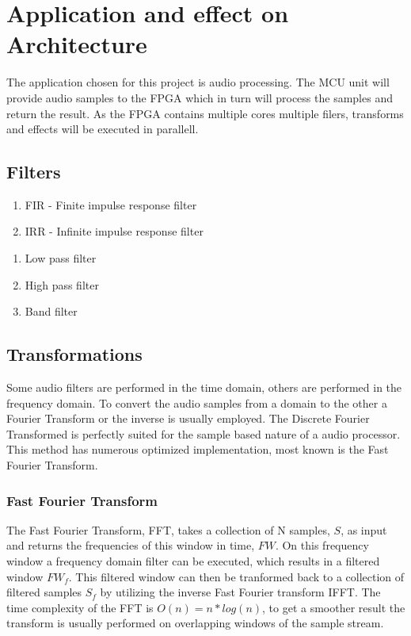 \section{Application and effect on Architecture}


The application chosen for this project is audio processing. The MCU unit will
provide audio samples to the FPGA which in turn will process the samples and
return the result. As the FPGA contains multiple cores multiple filers,
transforms and effects will be executed in parallell.

\subsection{Filters}

\begin{enumerate}
	\item FIR - Finite impulse response filter
	\item IRR - Infinite impulse response filter
\end{enumerate}

\begin{enumerate}
	\item Low pass filter
	\item High pass filter
	\item Band filter
\end{enumerate}

\subsection{Transformations}
Some audio filters are performed in the time domain, others are performed in the
frequency domain.  To convert the audio samples from a domain
to the other a Fourier Transform or the inverse is usually employed. The
Discrete Fourier Transformed  is perfectly suited for the sample based
nature of a audio processor. This method has numerous optimized implementation,
most known is the Fast Fourier Transform.

\subsubsection{Fast Fourier Transform}
The Fast Fourier Transform, FFT, takes a collection of N samples, $S$, as input
and returns the frequencies of this window in time, $FW$. On this frequency
window a frequency domain filter can be executed, which results in a filtered
window $FW_f$. This filtered window can then be tranformed back to a collection
of filtered samples $S_f$ by utilizing the inverse Fast Fourier transform IFFT.
The time complexity of the FFT is $O(n) = n*log(n)$, to get a smoother result
the transform is usually performed on overlapping windows of the sample stream.

